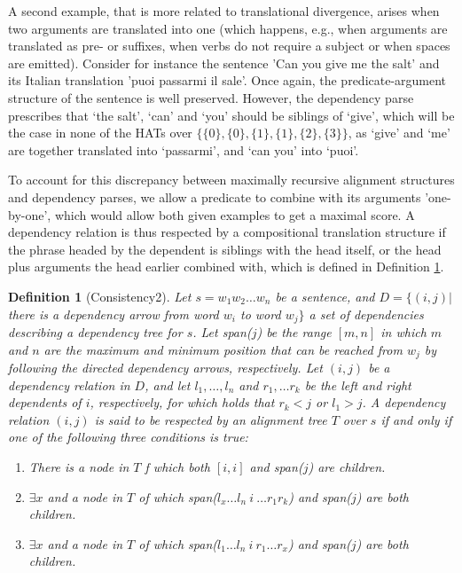 \documentclass{report}
\theoremstyle{definition}
\theoremstyle{plain}
\newtheorem{definition}{Definition}
\begin{document}
A second example, that is more related to translational divergence, arises when two arguments are translated into one (which happens, e.g., when arguments are translated as pre- or suffixes, when verbs do not require a subject or when spaces are emitted). Consider for instance the sentence 'Can you give me the salt' and its Italian translation 'puoi passarmi il sale'. Once again, the predicate-argument structure of the sentence is well preserved. However, the dependency parse prescribes that `the salt', `can' and `you' should be siblings of `give', which will be the case in none of the HATs over $\{\{0\},\{0\},\{1\},\{1\},\{2\},\{3\}\}$, as `give' and `me' are together translated into `passarmi', and `can you' into `puoi'.

To account for this discrepancy between maximally recursive alignment structures and dependency parses, we allow a predicate to combine with its arguments 'one-by-one', which would allow both given examples to get a maximal score. A dependency relation is thus respected by a compositional translation structure if the phrase headed by the dependent is siblings with the head itself, or the head plus arguments the head earlier combined with, which is defined in Definition \ref{def:depHAT2}.

\begin{definition}[Consistency2]\label{def:depHAT2}
Let $s = w_1 w_2 \dots w_n$ be a sentence, and $D = \{ (i,j) |$ there is a dependency arrow from word $w_i$ to word $w_j \}$ a set of dependencies describing a dependency tree for $s$. Let span($j$) be the range $[m,n]$ in which $m$ and $n$ are the maximum and minimum position that can be reached from $w_j$ by following the directed dependency arrows, respectively. Let $(i,j)$ be a dependency relation in $D$, and let $l_1,\ldots,l_n$ and $r_1,\ldots r_k$ be the left and right dependents of $i$, respectively, for which holds that $r_k < j$ or $l_1 > j$. A dependency relation $(i,j)$ is said to be respected by an alignment tree $T$ over $s$ if and only if one of the following three conditions is true: \begin{enumerate}
\item There is a node in $T$ f which both $[i,i]$ and span($j$) are children.
\item $\exists x$  and a node in $T$ of which span($l_x\ldots l_n~i~\ldots r_1 r_k$) and span($j$) are both children.
\item $\exists x$  and a node in $T$ of which span($l_1\ldots l_n~i~r_1\ldots r_x$) and span($j$) are both children.
\end{enumerate} 
\end{definition}
\end{document}
